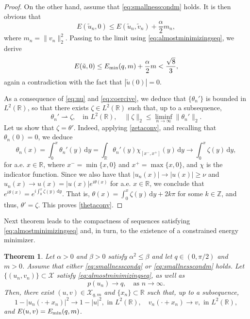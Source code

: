 \documentclass[11pt]{article}
\newcommand{\R}{\mathbb{R}}
\newcommand{\boX}{\mathcal{X}}
\newcommand{\Emin}{E_\textup{min}}
\renewcommand{\d}{\,\mathrm{d}}
\theoremstyle{plain}
\newtheorem{theorem}{Theorem}[section]
\theoremstyle{definition}
\theoremstyle{remark}
\numberwithin{equation}{section}
\begin{document}
{\begin{proof}
On the other hand, assume that \eqref{eq:smallnesscondm} holds. It is then obvious that
\[E(\tilde u_n,0)\leq E(\tilde u_n,\tilde v_n)+\frac{\alpha}{2}m_n,\]
where $m_n=\|v_n\|_2^2$. Passing to the limit using \eqref{eq:almostminimizingseq}, we derive
\[E(\tilde u,0)\leq \Emin(q,m)+\frac{\alpha}{2}m<\frac{\sqrt{8}}{3},\]
again a contradiction with the fact that $|\tilde u(0)|=0$.

As a consequence of \eqref{eq:nu} and \eqref{eq:coercive}, we deduce that $\{\theta_n'\}$ is bounded in $L^2(\R)$, so that there exists $\zeta\in L^2(\R)$ such that, up to a subsequence, 
\begin{equation}\label{zetaconv}
\theta_n'\rightharpoonup \zeta,\quad\text{in }L^2(\R),\quad \|\zeta\|_2\leq\liminf_{n\to\infty}\|\theta_n'\|_2.
\end{equation}
Let us show that $\zeta=\theta'$. Indeed, applying \eqref{zetaconv}, and recalling that $\theta_n(0)=0$, we deduce
\[\theta_n(x)=\int_0^x \theta_n'(y)\d y=\int_\R\theta_n'(y)\chi_{[x^-,x^+]}(y)\d y\to \int_0^x\zeta(y)\d y,\]
for a.e. $x\in\R$, where $x^-=\min\{x,0\}$ and $x^+=\max\{x,0\}$, and $\chi$ is the indicator function. Since we also have that $|u_n(x)|\to|u(x)|\geq\nu$ and $u_n(x)\to u(x)=|u(x)| e^{i\theta(x)}$ for a.e. $x\in\R$, we conclude that $e^{i\theta(x)}=e^{i\int_0^x\zeta(y)\d y}$. That is, $\theta(x)=\int_0^x\zeta(y)\d y+2k\pi$ for some $k\in\mathbb{Z}$, and thus, $\theta'=\zeta$. This proves \eqref{thetaconv}.
\end{proof}

Next theorem leads to the compactness of {sequences satisfying \eqref{eq:almostminimizingseq}} and, in turn, to the existence of a constrained energy minimizer.

\begin{theorem}\label{thm:compactness}
    Let $\alpha>0$ and $\beta > 0$ satisfy $\alpha^2\leq\beta$ and let $q\in (0,\pi/2)$ and $m>0$. Assume that either \eqref{eq:smallnesscondq} or \eqref{eq:smallnesscondm}  holds. Let $\{(u_n,v_n)\}\subset\boX$ satisfy \eqref{eq:almostminimizingseq}, as well as
    \begin{equation}\label{eq:momentumconv}
        p(u_n)\to q,\quad\text{as }n\to\infty.
    \end{equation}
    Then, there exist $(u,v)\in\boX_{q,m}$ and $\{x_n\}\subset\R$ such that, up to a subsequence, 
\begin{equation}\label{eq:strongconv}
1-|u_n(\cdot + x_n)|^2\to 1-|u|^2,\text{ in }L^2(\R),\quad v_n(\cdot+x_n)\to v,\text{ in }L^2(\R),
\end{equation}
and $E(u,v)=\Emin(q,m)$. 
\end{theorem}

}
\end{document}

